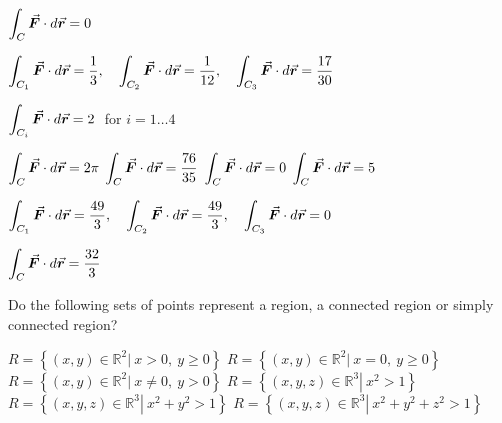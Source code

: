 \begin{Answer}
    
        \Question $\ds \int_C \vec F\cdot d\vec r = 0$

        \Question $\ds \int_{C_1} \vec F\cdot d\vec r = \dfrac{1}{3}, \quad \ds \int_{C_2} \vec F\cdot d\vec r = \dfrac{1}{12}, \quad \ds \int_{C_3} \vec F\cdot d\vec r = \dfrac{17}{30}$
        
        \Question $\ds \int_{C_i} \vec F\cdot d\vec r = 2\ $ for $i=1\ldots4$
        
        \Question $\ds \int_C \vec F\cdot d\vec r = 2\pi$
        \Question $\ds \int_C \vec F\cdot d\vec r = \dfrac{76}{35}$
        \Question $\ds \int_C \vec F\cdot d\vec r = 0$
        \Question $\ds \int_C \vec F\cdot d\vec r= 5$
        
        \Question $\ds \int_{C_1} \vec F\cdot d\vec r = \dfrac{49}{3}, \quad \ds \int_{C_2} \vec F\cdot d\vec r = \dfrac{49}{3}, \quad \ds \int_{C_3} \vec F\cdot d\vec r = 0$
       
        \Question $\ds \int_C \vec F\cdot d\vec r = \dfrac{32}{3}$
    
\end{Answer}



\begin{Exercise}[difficulty = 3]
Do the following sets of points represent a region, a connected region or simply connected region?
    \begin{multicols}{2}
    \Question $R = \left\{ (x,y) \in \mathbb{R}^2 \left| \ x > 0, \ y \geq 0  \right. \right\}$
    \Question $R = \left\{ (x,y) \in \mathbb{R}^2 \left| \ x = 0, \ y \geq 0  \right. \right\}$
    \Question $R = \left\{ (x,y) \in \mathbb{R}^2 \left| \ x \neq 0, \ y > 0  \right. \right\}$
    \Question $R = \left\{ (x,y,z) \in \mathbb{R}^3 \left| \ x^2 > 1  \right. \right\}$
    \Question $R = \left\{ (x,y,z) \in \mathbb{R}^3 \left| \ x^2 + y^2 > 1  \right. \right\}$
    \Question $R = \left\{ (x,y,z) \in \mathbb{R}^3 \left| \ x^2 + y^2 + z^2 > 1  \right. \right\}$
    \EndCurrentQuestion
    \end{multicols}
\end{Exercise}


